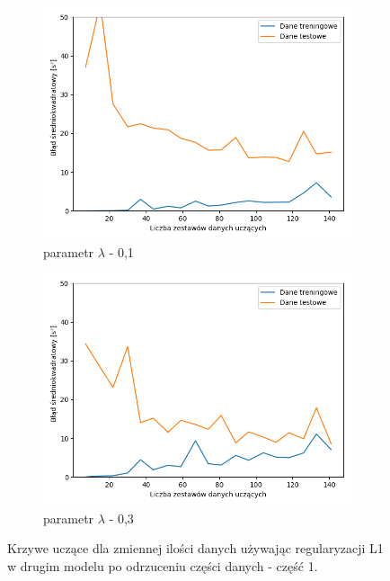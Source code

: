 \documentclass[12pt]{aghdpl}
\begin{document}
		\begin{figure}[h]
			\centering
			\begin{subfigure}{.8\linewidth}
		 		\includegraphics[width =\linewidth]{wykresy/7_badanie_danych/l1/regularyzacja_0_1_learning_curves.png}
		 		\caption{parametr $\lambda$ - 0,1}
		 	\end{subfigure}
		 	\begin{subfigure}{.8\linewidth}
		 		\includegraphics[width =\linewidth]{wykresy/7_badanie_danych/l1/regularyzacja_0_3_learning_curves.png}
		 		\caption{parametr $\lambda$ - 0,3}
		 	\end{subfigure}
		 	
		 	\caption{Krzywe uczące dla zmiennej ilości danych używając regularyzacji L1 w drugim modelu po odrzuceniu części danych - część 1.}
			\label{fig: drugi_model_przy_regularyzacji_l1_po_odrzuceniu_czesci_danych_learning_curves_1}
		\end{figure}
		
\end{document}
